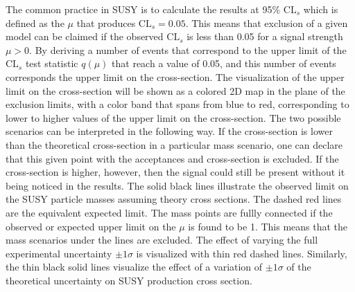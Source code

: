 The common practice in SUSY is to calculate the results at 95\% $\mathrm{CL}_{s}$ which is defined as the $\mu$ that produces $\mathrm{CL}_{s}=0.05$.
This means that exclusion of a given model can be claimed if the observed $\mathrm{CL}_{s}$ is less than 0.05 for a signal strength $\mu>0$. 
By deriving a number of events that correspond to the upper limit of the $\mathrm{CL}_{s}$ test statistic $q(\mu)$ that reach a value of 0.05, and this number of events corresponds the upper limit on the cross-section. 
The visualization of the upper limit on the cross-section will be shown as a colored 2D map in the plane of the exclusion limits, with a color band that spans from blue to red, corresponding to lower to higher values of the upper limit on the cross-section.  
The two possible scenarios can be interpreted in the following way.  
If the cross-section is lower than the theoretical cross-section in a particular mass scenario, one can declare that this given point with the acceptances and cross-section is excluded.
If the cross-section is higher, however, then the signal could still be present without it being noticed in the results.
The solid black lines illustrate the observed limit on the SUSY particle masses assuming theory cross sections.
The dashed red lines are the equivalent expected limit.
The mass points are fullly connected if the observed or expected upper limit on the $\mu$ is found to be 1.
This means that the mass scenarios under the lines are excluded.
The effect of varying the full experimental uncertainty $\pm 1 \sigma$ is visualized with thin red dashed lines.
Similarly, the thin black solid lines visualize the effect of a variation of $\pm 1 \sigma$ of the theoretical uncertainty on SUSY production cross section.
